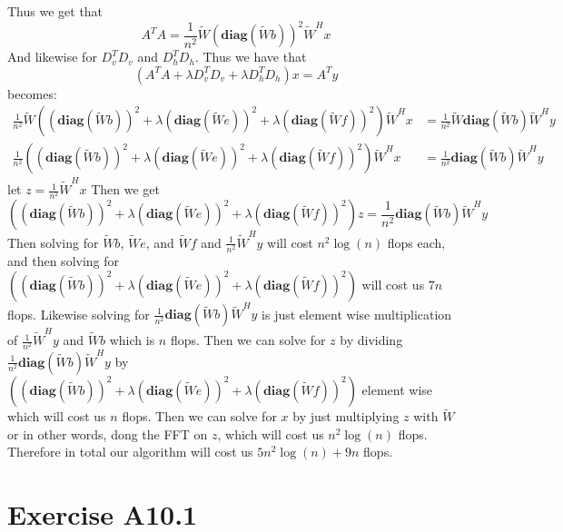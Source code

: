 Thus we get that 
$$A^TA=\frac{1}{n^2}\tilde{W}\left(\textbf{diag}(\tilde{W}b)\right)^2\tilde{W}^Hx$$
And likewise for $D_v^TD_v$ and $D_h^TD_h$. Thus we have that
$$(A^TA+\lambda D^T_vD_v+\lambda D^T_hD_h)x=A^Ty$$
becomes:
\begin{align*}
    \frac{1}{n^2}\tilde{W}\left(\left(\textbf{diag}(\tilde{W}b)\right)^2 +\lambda \left(\textbf{diag}(\tilde{W}e)\right)^2 
            +\lambda \left(\textbf{diag}(\tilde{W}f)\right)^2\right)\tilde{W}^Hx
            &=\frac{1}{n^2}\tilde{W}\textbf{diag}(\tilde{W}b)\tilde{W}^Hy\\
            \frac{1}{n^2}\left(\left(\textbf{diag}(\tilde{W}b)\right)^2 +\lambda \left(\textbf{diag}(\tilde{W}e)\right)^2 
            +\lambda \left(\textbf{diag}(\tilde{W}f)\right)^2\right)\tilde{W}^Hx
            &=\frac{1}{n^2}\textbf{diag}(\tilde{W}b)\tilde{W}^Hy
\end{align*}
let $z=\frac{1}{n^2}\tilde{W}^Hx$ Then we get
$$\left(\left(\textbf{diag}(\tilde{W}b)\right)^2 +\lambda \left(\textbf{diag}(\tilde{W}e)\right)^2 
            +\lambda \left(\textbf{diag}(\tilde{W}f)\right)^2\right)z
            =\frac{1}{n^2}\textbf{diag}(\tilde{W}b)\tilde{W}^Hy$$
Then solving for $\tilde{W}b$, $\tilde{W}e$, and $\tilde{W}f$ and $\frac{1}{n^2}\tilde{W}^Hy$ 
will cost $n^2\log(n)$ flops each, and then solving for 
$\left(\left(\textbf{diag}(\tilde{W}b)\right)^2 +\lambda \left(\textbf{diag}(\tilde{W}e)\right)^2 
+\lambda \left(\textbf{diag}(\tilde{W}f)\right)^2\right)$ will cost 
us $7n$ flops. Likewise solving for $\frac{1}{n^2}\textbf{diag}(\tilde{W}b)\tilde{W}^Hy$
is just element wise multiplication of $\frac{1}{n^2}\tilde{W}^Hy$ and 
$\tilde{W}b$ which is $n$ flops. Then we can solve for 
$z$ by dividing $\frac{1}{n^2}\textbf{diag}(\tilde{W}b)\tilde{W}^Hy$
by $\left(\left(\textbf{diag}(\tilde{W}b)\right)^2 +\lambda \left(\textbf{diag}(\tilde{W}e)\right)^2
+\lambda \left(\textbf{diag}(\tilde{W}f)\right)^2\right)$
element wise which will cost us $n$ flops. Then we can solve for $x$ by 
just multiplying $z$ with $\tilde{W}$ 
or in other words, dong the FFT on $z$, which will cost us $n^2\log(n)$ flops. 
Therefore in total our algorithm will cost us 
$5n^2\log(n)+9n$ flops.

\section*{Exercise A10.1}
